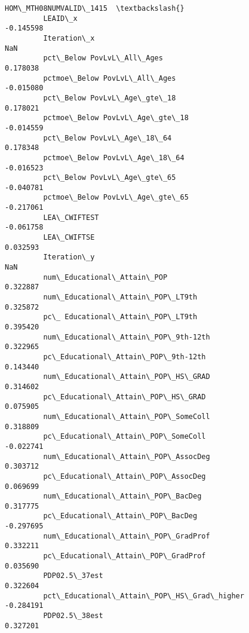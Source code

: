 \documentclass[11pt]{article}
\begin{document}
\begin{Verbatim}[commandchars=\\\{\}]
                                                    HOM\_MTH08NUMVALID\_1415  \textbackslash{}
         LEAID\_x                                                 -0.145598   
         Iteration\_x                                                   NaN   
         pct\_Below PovLvL\_All\_Ages                                0.178038   
         pctmoe\_Below PovLvL\_All\_Ages                            -0.015080   
         pct\_Below PovLvL\_Age\_gte\_18                              0.178021   
         pctmoe\_Below PovLvL\_Age\_gte\_18                          -0.014559   
         pct\_Below PovLvL\_Age\_18\_64                               0.178348   
         pctmoe\_Below PovLvL\_Age\_18\_64                           -0.016523   
         pct\_Below PovLvL\_Age\_gte\_65                             -0.040781   
         pctmoe\_Below PovLvL\_Age\_gte\_65                          -0.217061   
         LEA\_CWIFTEST                                            -0.061758   
         LEA\_CWIFTSE                                              0.032593   
         Iteration\_y                                                   NaN   
         num\_Educational\_Attain\_POP                               0.322887   
         num\_Educational\_Attain\_POP\_LT9th                         0.325872   
         pc\_ Educational\_Attain\_POP\_LT9th                         0.395420   
         num\_Educational\_Attain\_POP\_9th-12th                      0.322965   
         pc\_Educational\_Attain\_POP\_9th-12th                       0.143440   
         num\_Educational\_Attain\_POP\_HS\_GRAD                       0.314602   
         pc\_Educational\_Attain\_POP\_HS\_GRAD                        0.075905   
         num\_Educational\_Attain\_POP\_SomeColl                      0.318809   
         pc\_Educational\_Attain\_POP\_SomeColl                      -0.022741   
         num\_Educational\_Attain\_POP\_AssocDeg                      0.303712   
         pc\_Educational\_Attain\_POP\_AssocDeg                       0.069699   
         num\_Educational\_Attain\_POP\_BacDeg                        0.317775   
         pc\_Educational\_Attain\_POP\_BacDeg                        -0.297695   
         num\_Educational\_Attain\_POP\_GradProf                      0.332211   
         pc\_Educational\_Attain\_POP\_GradProf                       0.035690   
         PDP02.5\_37est                                            0.322604   
         pct\_Educational\_Attain\_POP\_HS\_Grad\_higher               -0.284191   
         PDP02.5\_38est                                            0.327201   

\end{Verbatim}
\end{document}
